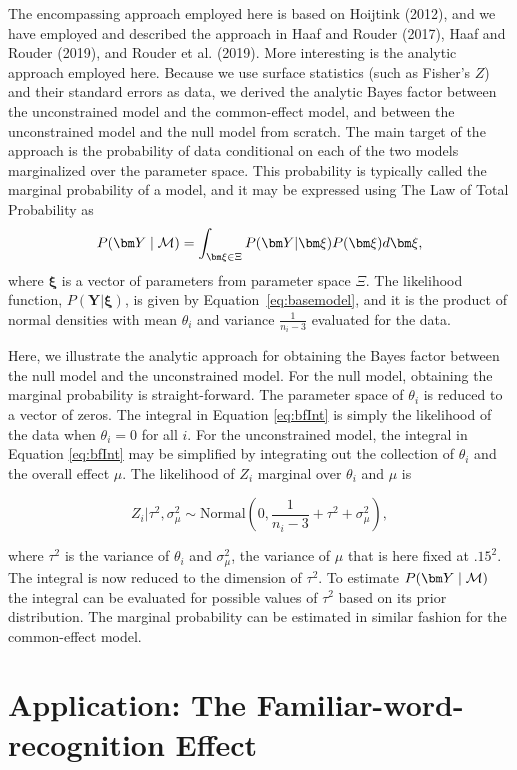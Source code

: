 \documentclass[english,,man]{apa6}
\begin{document}
The encompassing approach employed here is based on Hoijtink (2012), and we have employed and described the approach in Haaf and Rouder (2017), Haaf and Rouder (2019), and Rouder et al. (2019). More interesting is the analytic approach employed here. Because we use surface statistics (such as Fisher's \(Z\)) and their standard errors as data, we derived the analytic Bayes factor between the unconstrained model and the common-effect model, and between the unconstrained model and the null model from scratch. The main target of the approach is the probability of data conditional on each of the two models marginalized over the parameter space. This probability is typically called the marginal probability of a model, and it may be expressed using The Law of Total Probability as
\begin{equation} \label{eq:bfInt}
P(\bm Y\mid {\cal M}) = \int_{\bm \xi\in \Xi} P(\bm Y|\bm \xi)P(\bm \xi)d\bm \xi,
\end{equation}
where \(\bm \xi\) is a vector of parameters from parameter space \(\Xi\). The likelihood function, \(P(\bm Y|\bm \xi)\), is given by Equation~\eqref{eq:basemodel}, and it is the product of normal densities with mean \(\theta_i\) and variance \(\frac{1}{n_i - 3}\) evaluated for the data.

Here, we illustrate the analytic approach for obtaining the Bayes factor between the null model and the unconstrained model. For the null model, obtaining the marginal probability is straight-forward. The parameter space of \(\theta_i\) is reduced to a vector of zeros. The integral in Equation \eqref{eq:bfInt} is simply the likelihood of the data when \(\theta_i = 0\) for all \(i\). For the unconstrained model, the integral in Equation \eqref{eq:bfInt} may be simplified by integrating out the collection of \(\theta_i\) and the overall effect \(\mu\). The likelihood of \(Z_i\) marginal over \(\theta_i\) and \(\mu\) is

\[Z_i | \tau^2, \sigma^2_\mu \sim \mbox{Normal}(0, \frac{1}{n_i - 3} + \tau^2 + \sigma^2_\mu),\]

where \(\tau^2\) is the variance of \(\theta_i\) and \(\sigma^2_\mu\), the variance of \(\mu\) that is here fixed at \(.15^2\). The integral is now reduced to the dimension of \(\tau^2\). To estimate \(P(\bm Y\mid {\cal M})\) the integral can be evaluated for possible values of \(\tau^2\) based on its prior distribution. The marginal probability can be estimated in similar fashion for the common-effect model.

\hypertarget{application-the-familiar-word-recognition-effect}{%
\section{Application: The Familiar-word-recognition Effect}\label{application-the-familiar-word-recognition-effect}}
\end{document}
